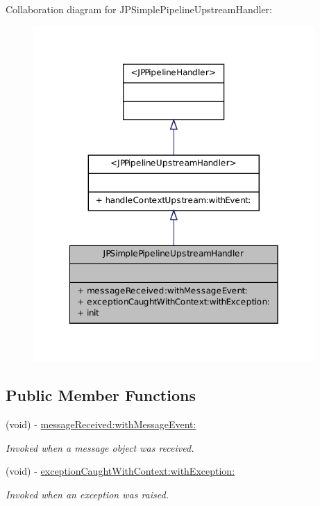 Collaboration diagram for JPSimplePipelineUpstreamHandler:\nopagebreak
\begin{figure}[H]
\begin{center}
\leavevmode
\includegraphics[width=304pt]{a00165}
\end{center}
\end{figure}
\subsection*{Public Member Functions}
\begin{DoxyCompactItemize}
\item 
(void) -\/ \hyperlink{a00039_ad4b20a4d32e1064cdeec4d0be6c17dd0}{messageReceived:withMessageEvent:}
\begin{DoxyCompactList}\small\item\em Invoked when a message object was received. \item\end{DoxyCompactList}\item 
(void) -\/ \hyperlink{a00039_a4c8e469d611291abdc56a79b7056a9ff}{exceptionCaughtWithContext:withException:}
\begin{DoxyCompactList}\small\item\em Invoked when an exception was raised. \item\end{DoxyCompactList}\end{DoxyCompactItemize}
